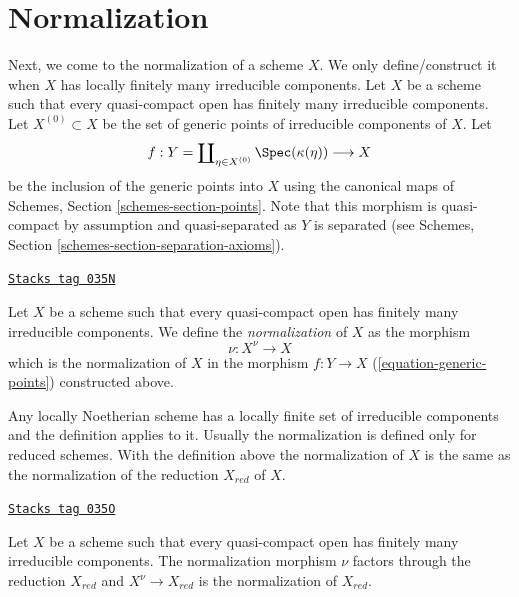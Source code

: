 \section{Normalization}
\label{morphisms-section-normalization}
Next, we come to the normalization of a scheme $X$.
We only define/construct it when $X$ has locally finitely many irreducible
components. Let $X$ be a scheme such that every quasi-compact open has
finitely many irreducible components. Let
$X^{(0)} \subset X$ be the set of generic points of irreducible components
of $X$. Let
\begin{equation}
\label{equation-generic-points}
f :
Y = \coprod\nolimits_{\eta \in X^{(0)}} \Spec(\kappa(\eta))
\longrightarrow
X
\end{equation}
be the inclusion of the generic points into $X$ using the
canonical maps of Schemes, Section \ref{schemes-section-points}.
Note that this morphism is quasi-compact by assumption and
quasi-separated as $Y$ is separated (see
Schemes, Section \ref{schemes-section-separation-axioms}).

\begin{definition}[Normalization]
\label{morphisms-definition-normalization}
\href{https://stacks.math.columbia.edu/tag/035N}{\texttt{Stacks tag 035N}}

Let $X$ be a scheme such that every quasi-compact open has
finitely many irreducible components. We define the
{\it normalization} of $X$ as the morphism
$$
\nu : X^\nu \longrightarrow X
$$
which is the normalization of $X$ in the morphism $f : Y \to X$
(\ref{equation-generic-points}) constructed above.
\end{definition}

Any locally Noetherian scheme has a locally finite set of irreducible
components and the definition applies to it.
Usually the normalization is defined only for reduced schemes.
With the definition above the normalization of $X$ is the same
as the normalization of the reduction $X_{red}$ of $X$.

\begin{lemma}
\label{morphisms-lemma-normalization-reduced}
\href{https://stacks.math.columbia.edu/tag/035O}{\texttt{Stacks tag 035O}}

Let $X$ be a scheme such that every quasi-compact open has
finitely many irreducible components. The normalization morphism
$\nu$ factors through the reduction $X_{red}$ and $X^\nu \to X_{red}$
is the normalization of $X_{red}$.
\end{lemma}

